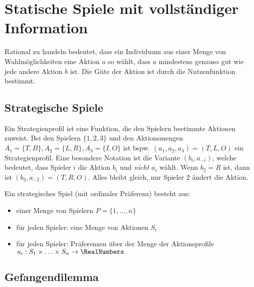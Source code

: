 \section{Statische Spiele mit vollständiger Information}%
\label{sec:statische_spiele_mit_vollstandiger_information}

\begin{definition}[Rationalität]
  Rational zu handeln bedeutet, dass ein Individuum aus einer Menge von Wahlmöglichkeiten
  eine Aktion $a$ so wählt, dass $a$ mindestens genauso gut wie jede andere Aktion $b$
  ist.
  Die Güte der Aktion ist durch die Nutzenfunktion bestimmt.
\end{definition}

\subsection{Strategische Spiele}%
\label{sub:strategische_spiele}

Ein Strategienprofil ist eine Funktion, die den Spielern bestimmte Aktionen zuweist.
Bei den Spielern $\{1,2,3\}$ und den Aktionsmengen
$A_1 = \{T, B\}, A_2 = \{L, R\}, A_3 = \{I, O\}$
ist bspw. $(a_1, a_2, a_3) = (T, L, O)$ ein Strategienprofil.
Eine besondere Notation ist die Variante $(b_i, a_{-i})$, welche bedeutet, dass Spieler
$i$ die Aktion $b_i$ und \emph{nicht} $a_i$ wählt.
Wenn $b_2 = R$ ist, dann ist $(b_2, a_{-2}) = (T, R, O)$.
Alles bleibt gleich, nur Spieler $2$ ändert die Aktion.

\begin{definition}
  Ein strategisches Spiel (mit ordinaler Präferenz) besteht aus:
  \begin{itemize}
    \item einer Menge von Spielern $P = \{1, \ldots, n\}$
    \item für jeden Spieler: eine Menge von Aktionen $S_i$
    \item für jeden Spieler: Präferenzen über der Menge der Aktionsprofile
      $u_i: S_1 \times \ldots \times S_n \to \RealNumbers$
  \end{itemize}
\end{definition}

\subsection{Gefangendilemma}%
\label{sub:gefangendilemma}

